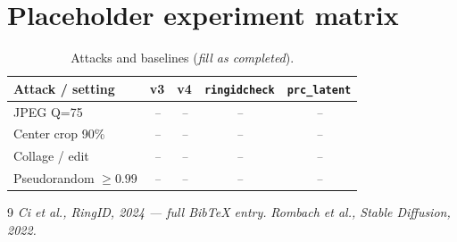 \documentclass[11pt,a4paper]{article}
\newcommand{\placeholder}[1]{\textcolor{gray!70!black}{\textit{#1}}}
\begin{document}
\section{Placeholder experiment matrix}

\begin{table}[h]
  \centering
  \caption{Attacks and baselines (\placeholder{fill as completed}).}
  \small
  \begin{tabular}{@{}lcccc@{}}
    \toprule
    Attack / setting & v3 & v4 & \texttt{ringidcheck} & \texttt{prc\_latent} \\
    \midrule
    JPEG Q=75 & \placeholder{--} & \placeholder{--} & \placeholder{--} & \placeholder{--} \\
    Center crop 90\% & \placeholder{--} & \placeholder{--} & \placeholder{--} & \placeholder{--} \\
    Collage / edit & \placeholder{--} & \placeholder{--} & \placeholder{--} & \placeholder{--} \\
    Pseudorandom $\ge 0.99$ & \placeholder{--} & \placeholder{--} & \placeholder{--} & \placeholder{--} \\
    \bottomrule
  \end{tabular}
\end{table}


\begin{thebibliography}{9}
\placeholder{Ci et al., RingID, 2024 --- full BibTeX entry.}
\placeholder{Rombach et al., Stable Diffusion, 2022.}
\end{thebibliography}
\end{document}
